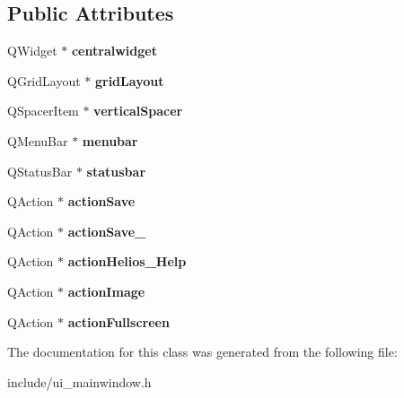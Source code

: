 \subsection*{Public Attributes}
\begin{DoxyCompactItemize}
\item 
\hypertarget{class_ui___main_window_a39420100bfee3ba57f137af5a3b0f8e9}{Q\-Widget $\ast$ {\bfseries centralwidget}}\label{class_ui___main_window_a39420100bfee3ba57f137af5a3b0f8e9}

\item 
\hypertarget{class_ui___main_window_ac4586abe48f0aabf940b0dc2df3772ed}{Q\-Grid\-Layout $\ast$ {\bfseries grid\-Layout}}\label{class_ui___main_window_ac4586abe48f0aabf940b0dc2df3772ed}

\item 
\hypertarget{class_ui___main_window_a2c53f7f2e3106a4225d5be295e1315ae}{Q\-Spacer\-Item $\ast$ {\bfseries vertical\-Spacer}}\label{class_ui___main_window_a2c53f7f2e3106a4225d5be295e1315ae}

\item 
\hypertarget{class_ui___main_window_adf43d9a67adaec750aaa956b5e082f09}{Q\-Menu\-Bar $\ast$ {\bfseries menubar}}\label{class_ui___main_window_adf43d9a67adaec750aaa956b5e082f09}

\item 
\hypertarget{class_ui___main_window_a07519bbb9a350befd6feb4e84ef299fd}{Q\-Status\-Bar $\ast$ {\bfseries statusbar}}\label{class_ui___main_window_a07519bbb9a350befd6feb4e84ef299fd}

\item 
\hypertarget{class_ui___main_window_a6e14788227f1a0dbc8cf983514685f3b}{Q\-Action $\ast$ {\bfseries action\-Save}}\label{class_ui___main_window_a6e14788227f1a0dbc8cf983514685f3b}

\item 
\hypertarget{class_ui___main_window_a8f7af7030d94b55df86c0c11211618dd}{Q\-Action $\ast$ {\bfseries action\-Save\-\_}}\label{class_ui___main_window_a8f7af7030d94b55df86c0c11211618dd}

\item 
\hypertarget{class_ui___main_window_a8ed7b603c3cf05ce4f92b91a318c3070}{Q\-Action $\ast$ {\bfseries action\-Helios\-\_\-\-Help}}\label{class_ui___main_window_a8ed7b603c3cf05ce4f92b91a318c3070}

\item 
\hypertarget{class_ui___main_window_afb196697063a1024bcf0166786939f4c}{Q\-Action $\ast$ {\bfseries action\-Image}}\label{class_ui___main_window_afb196697063a1024bcf0166786939f4c}

\item 
\hypertarget{class_ui___main_window_a6a3f73260e4dd008b67906e39aedc7fc}{Q\-Action $\ast$ {\bfseries action\-Fullscreen}}\label{class_ui___main_window_a6a3f73260e4dd008b67906e39aedc7fc}

\end{DoxyCompactItemize}


The documentation for this class was generated from the following file\-:\begin{DoxyCompactItemize}
\item 
include/ui\-\_\-mainwindow.\-h\end{DoxyCompactItemize}
